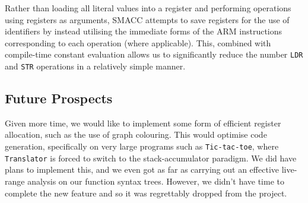 \documentclass[a4wide, 10pt]{article}
\begin{document}
Rather than loading all literal values into a register and performing operations using registers as arguments, SMACC attempts to save registers for the use of identifiers by instead utilising the immediate forms of the ARM instructions corresponding to each operation (where applicable). This, combined with compile-time constant evaluation allows us to significantly reduce the number \texttt{LDR} and \texttt{STR} operations in a relatively simple manner.   

\subsection*{Future Prospects}

\noindent Given more time, we would like to implement some form of efficient register allocation, such as the use of graph colouring. This would optimise code generation, specifically on very large programs such as \texttt{Tic-tac-toe}, where \texttt{Translator} is forced to switch to the stack-accumulator paradigm. We did have plans to implement this, and we even got as far as carrying out an effective live-range analysis on our function syntax trees. However, we didn't have time to complete the new feature and so it was regrettably dropped from the project.
\end{document}
